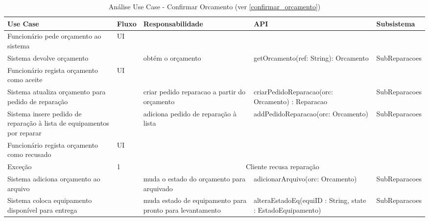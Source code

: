 \documentclass[../relatorio.tex]{subfiles}
\begin{document}
\begin{landscape}
    \begin{table}[!h]
        \centering
        \begin{tabular}{|p{5cm}|p{1cm}|p{4cm}|p{6cm}|p{3cm}|}
            \hline
            \rowcolor{gray!20!white}
            Use Case & Fluxo                                            & Responsabilidade & API & Subsistema \\
            \hline
            \rowcolor{yellow}
            Funcionário pede orçamento ao sistema
                     & UI
                     & 
                     & 
                     & 
            \\
            \hline
            Sistema devolve orçamento
                     & 
                     & obtém o orçamento
                     & getOrcamento(ref: String): Orcamento
                     & SubReparacoes
            \\
            \hline
            \rowcolor{yellow}
            Funcionário regista orçamento como aceite
                     & UI
                     & 
                     & 
                     & 
            \\
            \hline
            Sistema atualiza orçamento para pedido de reparação
                     & 
                     & criar pedido reparacao a partir do orçamento
                     & criarPedidoReparacao(orc: Orcamento) : Reparacao
                     & SubReparacoes
            \\
            \hline
            Sistema insere pedido de reparação à lista de equipamentos por reparar
                     & 
                     & adiciona pedido de reparação à lista
                     & addPedidoReparacao(orc: Orcamento)
                     & SubReparacoes
            \\
            \hline
            \rowcolor{yellow}
            Funcionário regista orçamento como recusado
                     & UI
                     & 
                     & 
                     & 
            \\
            \hline
            \rowcolor{red!30}
            Exceção  & 1                                                 &  \multicolumn{3}{c}{Cliente recusa reparação}\\
            \hline
            Sistema adiciona orçamento ao arquivo
                     & 
                     & muda o estado do orçamento para arquivado
                     & adicionarArquivo(orc: Orcamento)
                     & SubReparacoes
            \\
            \hline
            Sistema coloca equipamento disponível para entrega
                     & 
                     & muda estado de equipamento para pronto para levantamento
                     & alteraEstadoEq(equiID : String, state : EstadoEquipamento)
                     & SubReparacoes
            \\
            \hline
        \end{tabular}
        \caption{Análise Use Case - Confirmar Orcamento (ver \ref{confirmar_orcamento})}
    \end{table}
\end{landscape}
\end{document}
